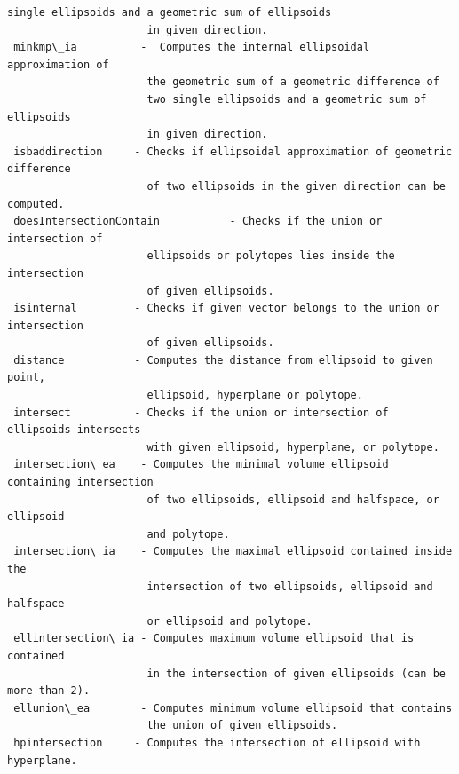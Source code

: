 \documentclass[letterpaper,10pt,english]{sphinxmanual}
\begin{document}
\begin{Verbatim}[commandchars=\\\{\}]
                      single ellipsoids and a geometric sum of ellipsoids
                      in given direction.
 minkmp\_ia          -  Computes the internal ellipsoidal approximation of
                      the geometric sum of a geometric difference of
                      two single ellipsoids and a geometric sum of ellipsoids
                      in given direction.
 isbaddirection     - Checks if ellipsoidal approximation of geometric difference
                      of two ellipsoids in the given direction can be computed.
 doesIntersectionContain           - Checks if the union or intersection of
                      ellipsoids or polytopes lies inside the intersection
                      of given ellipsoids.
 isinternal         - Checks if given vector belongs to the union or intersection
                      of given ellipsoids.
 distance           - Computes the distance from ellipsoid to given point,
                      ellipsoid, hyperplane or polytope.
 intersect          - Checks if the union or intersection of ellipsoids intersects
                      with given ellipsoid, hyperplane, or polytope.
 intersection\_ea    - Computes the minimal volume ellipsoid containing intersection
                      of two ellipsoids, ellipsoid and halfspace, or ellipsoid
                      and polytope.
 intersection\_ia    - Computes the maximal ellipsoid contained inside the
                      intersection of two ellipsoids, ellipsoid and halfspace
                      or ellipsoid and polytope.
 ellintersection\_ia - Computes maximum volume ellipsoid that is contained
                      in the intersection of given ellipsoids (can be more than 2).
 ellunion\_ea        - Computes minimum volume ellipsoid that contains
                      the union of given ellipsoids.
 hpintersection     - Computes the intersection of ellipsoid with hyperplane.
\end{Verbatim}
\end{document}

